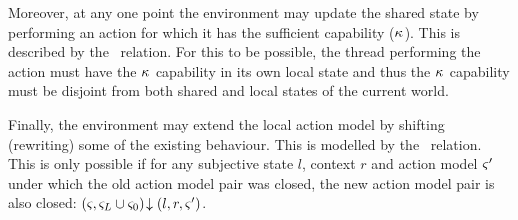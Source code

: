Moreover, at any one point the environment may update the shared state by performing an action for which it has the sufficient capability ($\kappa_{}$). This is described by the \updateR\ relation. For this to be possible, the thread performing the action must have the $\kappa_{}$ capability in its own local state and thus the $\kappa_{}$ capability must be disjoint from both shared and local states of the current world. 

Finally, the environment may extend the local action model by shifting (rewriting) some of the existing behaviour. This is modelled by the \shiftR\ relation. This is only possible if for any subjective state $l$, context $r$ and action model $\varsigma_{}'$ under which the old action model pair was closed, the new action model pair is also closed: $\left(\varsigma_{}, \varsigma_{L} \cup \varsigma_{0}\right) \!\downarrow \left(l, r, \varsigma_{}'\right)$. 

